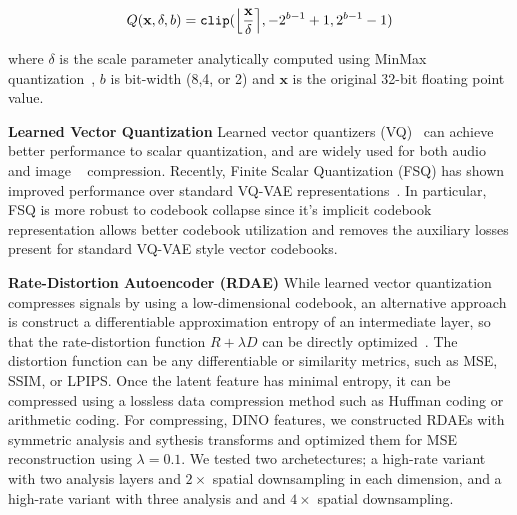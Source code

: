\documentclass[10pt,twocolumn,letterpaper]{article}
\begin{document}
\begin{equation}
  Q(\textbf{x}, \delta, b) = \texttt{clip}(\Big{\lfloor} \frac{\textbf{x}}{\delta} \Big{\rceil}, -2^{b-1}+1, 2^{b-1}-1)
  \label{eq:quant}
\end{equation}

where $\delta$ is the scale parameter analytically computed using MinMax quantization~\cite{jacob2018quantization}, $b$ is bit-width (8,4, or 2) and $\textbf{x}$ is the original 32-bit floating point value.

\textbf{Learned Vector Quantization} Learned vector quantizers (VQ)~\cite{van2017neural} can achieve better performance to scalar quantization, and are widely used for both audio~\cite{defossez2022high} and image ~\cite{Duan_2023, el-nouby2023image} compression. Recently, Finite Scalar Quantization (FSQ)  has shown improved performance over standard VQ-VAE representations~\cite{mentzer2023finite}. In particular, FSQ is more robust to codebook collapse since it's implicit codebook representation allows better codebook utilization and removes the auxiliary losses present for standard VQ-VAE style vector codebooks.

\textbf{Rate-Distortion Autoencoder (RDAE)} While learned vector quantization compresses signals by using a low-dimensional codebook, an alternative approach is construct a differentiable approximation entropy of an intermediate layer, so that the rate-distortion function $R+\lambda D$ can be directly optimized~\cite{balle2017end}. The distortion function can be any differentiable or similarity metrics, such as MSE, SSIM, or LPIPS.  Once the latent feature has minimal entropy, it can be compressed using a lossless data compression method such as Huffman coding or arithmetic coding. For compressing, DINO features, we constructed RDAEs with symmetric analysis and sythesis transforms and optimized them for MSE reconstruction using $\lambda=0.1$. We tested two archetectures; a high-rate variant with two analysis layers and $2\times$ spatial downsampling in each dimension, and a high-rate variant with three analysis and and $4\times$ spatial downsampling.
\end{document}
